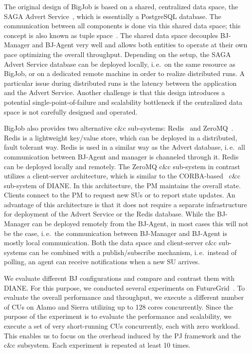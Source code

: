 \documentclass[conference,final]{IEEEtran}
\newcommand{\cus}{CUs\xspace}
\begin{document}
The original design of BigJob is based on a shared, centralized data
space, the SAGA Advert Service~\cite{saga_advert}, which is
essentially a PostgreSQL database. The communication between all
components is done via this shared data space; this concept is also known as
tuple space~\cite{Gelernter:1985:GCL:2363.2433}.  The shared data space
decouples BJ-Manager and BJ-Agent very well and allows both entities
to operate at their own pace optimizing the overall throughput.
Depending on the setup, the SAGA Advert Service database can be deployed 
locally, i.\,e.\ on the same resource as BigJob, or on a dedicated 
remote machine in order to
realize distributed runs. A particular issue during distributed runs is the
latency between the application and the Advert Service. Another
challenge is that this design introduces a potential
single-point-of-failure and scalability bottleneck if the centralized
data space is not carefully designed and operated.


BigJob also provides two alternative c\&c sub-systems:
Redis~\cite{redis} and ZeroMQ~\cite{zmq}. Redis is a lightweight
key/value store, which can be deployed in a distributed, fault
tolerant way. Redis is used in a similar way as the Advert database,
i.\,e.\ all communication between BJ-Agent and manager is channeled
through it. Redis can be deployed locally and remotely.  The ZeroMQ
c\&c sub-system in contrast utilizes a client-server architecture,
which is similar to the CORBA-based~\cite{OMG-CORBA303:2004}
c\&c sub-system of DIANE. In this architecture, the PM maintains
the overall state. Clients connect to the PM to request new SUs or to
report state updates. An advantage of this architecture is that it
does not require a separate infrastructure for deployment of the
Advert Service or the Redis database. While the BJ-Manager can be
deployed remotely from the BJ-Agent, in most cases this will not be
the case, i.\,e.\ the communication between BJ-Manager and BJ-Agent is
mostly local communication. Both the data space and client-server c\&c
sub-systems can be combined with a publish/subscribe mechanism,
i.\,e.\ instead of polling, an agent can receive notifications 
when a new SU arrives. 

We evaluate different BJ configurations and compare and contrast them with
DIANE. For this purpose, we conducted several experiments on
FutureGrid~\cite{fg}. To evaluate the overall performance and throughput, we
execute a different number of \cus on Alamo and Sierra utilizing up to 128 cores
concurrently. Since the purpose of the experiment is to evaluate the performance
and scalability, we execute a set of very short-running \cus concurrently, each 
with zero workload.  This enables us to focus on the
overhead induced by the PJ framework and the c\&c subsystem. Each experiment is
repeated at least 10 times.
\end{document}

